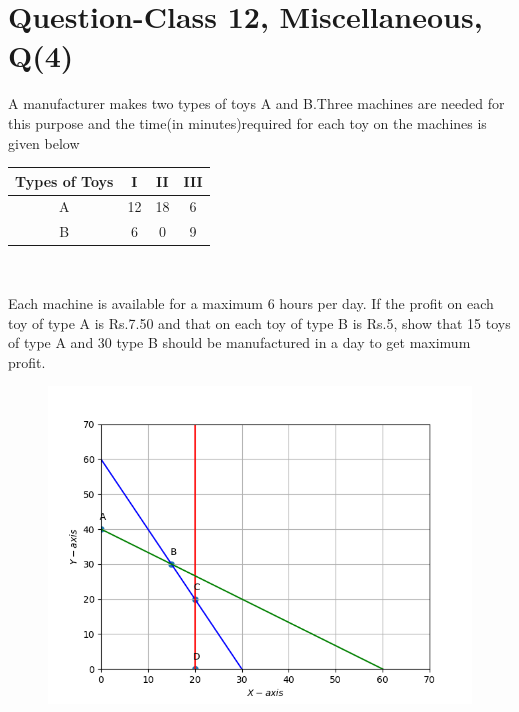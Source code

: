 \documentclass[journal,12pt,twocolumn]{IEEEtran}
\begin{document}
\section{Question-Class 12, Miscellaneous, Q(4)}
A manufacturer makes two types of toys A and B.Three machines are needed for this purpose and the time(in minutes)required for each toy on the machines is given below
\begin{table}[!ht]
	\centering
\begin{tabular}{|c|c|c|c|}
\hline
\textbf{Types of Toys} & \textbf{I} & \textbf{II} & \textbf{III}\\
\hline
A & 12 & 18 & 6\\
\hline
B & 6 & 0 & 9\\
\hline
\end{tabular}
\end{table}
\vspace{0.4cm}\\
\raggedright
Each machine is available for a maximum 6 hours per day. If the profit on each toy of type A is Rs.7.50 and that on each toy of type B is Rs.5, show that 15 toys of type A and 30 type B should be manufactured in a day to get maximum profit.
\fi
	\begin{figure}[!ht]
		\centering
		\includegraphics[width=\columnwidth]{12/12/3/4/figs/optlinear1.png}
		\caption{}
		\label{fig:12/12/3/4}
  	\end{figure}
	\iffalse
\end{document}
